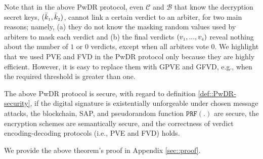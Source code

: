 %






Note that in the above PwDR protocol, even $\mathcal{C}$ and $\mathcal{B}$ that know the decryption secret keys, $(\bar k_{\scriptscriptstyle 1}, \bar k_{\scriptscriptstyle 2})$, cannot link a certain verdict to an arbiter, for two main reasons; namely,  (a) they do not know the masking random values used by arbiters to mask each verdict and (b) the final verdicts $(v_{\scriptscriptstyle 1},..., v_{\scriptscriptstyle 4})$ reveal nothing about the number of $1$ or $0$ verdicts, except when all arbiters vote $0$.  We highlight that we used PVE and FVD in the PwDR protocol only because they are highly efficient. However, it is easy to replace them with GPVE and GFVD, e.g., when the required threshold is greater than one. 



\begin{theorem}\label{theorem::PwDR-security}
The above PwDR protocol is secure, with regard to definition \ref{def::PwDR-security}, if the digital signature is existentially unforgeable under chosen message attacks,  the blockchain, SAP, and pseudorandom function $\mathtt{PRF}(.)$ are secure,  the encryption schemes are semantically secure, and the correctness of verdict encoding-decoding protocols (i.e., PVE and FVD) holds. 
\end{theorem}

We provide the above theorem's proof in Appendix \ref{sec::proof}.  

%



